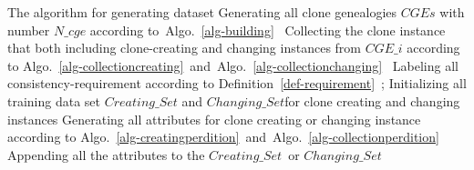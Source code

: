 \begin{minipage}{0.8\textwidth}
\centering
\begin{algorithm}[H]
 {The algorithm for generating dataset}
\label{alg-collection}
Generating all clone genealogies $CGEs$ with number $N\_cge$ according to~Algo.~\ref{alg-building}~\;
{ 
 Collecting the clone instance that both including clone-creating and changing instances from $CGE\_i$ according to Algo.~\ref{alg-collectioncreating}~and~Algo.~\ref{alg-collectionchanging}~\; 
 Labeling all consistency-requirement according to Definition~\ref{def-requirement}~;
}
Initializing all training data set $Creating\_Set$ and $Changing\_Set$for clone creating and changing instances\; 
{ 
Generating all attributes for clone creating or changing instance according to Algo.~\ref{alg-creatingperdition}~and~Algo.~\ref{alg-collectionperdition}~\;
Appending all the attributes to the $Creating\_Set$\ or $Changing\_Set$\;
}
\end{algorithm}
\end{minipage}


